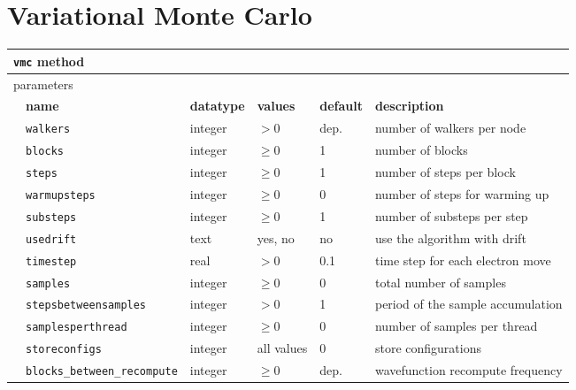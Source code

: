 \section{Variational Monte Carlo}
\label{sec:vmc}

\begin{table}[h]
\begin{center}
\begin{tabularx}{\textwidth}{l l l l l l }
\hline
\multicolumn{6}{l}{\texttt{vmc} method} \\
\hline
\multicolumn{2}{l}{parameters}  & \multicolumn{4}{l}{}\\
   &   \bfseries name     & \bfseries datatype & \bfseries values & \bfseries default   & \bfseries description \\
   &   \texttt{walkers             } &  integer  & $> 0$   & dep.& number of walkers per node  \\
   &   \texttt{blocks              } &  integer  & $\ge 0$ & 1   & number of blocks            \\
   &   \texttt{steps               } &  integer  & $\ge 0$ & 1   & number of steps per block   \\
   &   \texttt{warmupsteps         } &  integer  & $\ge 0$ & 0   & number of steps for warming up\\
   &   \texttt{substeps            } &  integer  & $\ge 0$ & 1   & number of substeps per step \\
   &   \texttt{usedrift            } &  text     & yes, no & no  & use the algorithm with drift\\
   &   \texttt{timestep            } &  real     & $> 0$   & 0.1 & time step for each electron move \\
   &   \texttt{samples             } &  integer  & $\ge 0$ & 0   & total number of samples \\
   &   \texttt{stepsbetweensamples } &  integer  & $> 0$   & 1   & period of the sample accumulation\\
   &   \texttt{samplesperthread    } &  integer  & $\ge 0$ & 0   & number of samples per thread  \\
   &   \texttt{storeconfigs        } &  integer  & all values & 0   & store configurations  \\
   &   \texttt{blocks\_between\_recompute} &  integer  & $\ge 0$ & dep.  & wavefunction recompute frequency  \\
  \hline
\end{tabularx}
\end{center}
\end{table}

